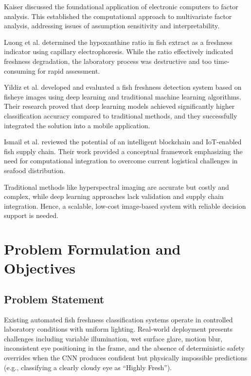 \documentclass[conference]{IEEEtran}
\begin{document}
Kaiser \cite{ref17} discussed the foundational application of electronic computers to factor analysis. This established the computational approach to multivariate factor analysis, addressing issues of assumption sensitivity and interpretability.

Luong et al. \cite{ref18} determined the hypoxanthine ratio in fish extract as a freshness indicator using capillary electrophoresis. While the ratio effectively indicated freshness degradation, the laboratory process was destructive and too time-consuming for rapid assessment.

Yildiz et al. \cite{ref19} developed and evaluated a fish freshness detection system based on fisheye images using deep learning and traditional machine learning algorithms. Their research proved that deep learning models achieved significantly higher classification accuracy compared to traditional methods, and they successfully integrated the solution into a mobile application.

Ismail et al. \cite{ref20} reviewed the potential of an intelligent blockchain and IoT-enabled fish supply chain. Their work provided a conceptual framework emphasizing the need for computational integration to overcome current logistical challenges in seafood distribution.

Traditional methods like hyperspectral imaging are accurate but costly and complex, while deep learning approaches lack validation and supply chain integration. Hence, a scalable, low-cost image-based system with reliable decision support is needed.

\section{Problem Formulation and Objectives}

\subsection{Problem Statement}

Existing automated fish freshness classification systems operate in controlled laboratory conditions with uniform lighting. Real-world deployment presents challenges including variable illumination, wet surface glare, motion blur, inconsistent eye positioning in the frame, and the absence of deterministic safety overrides when the CNN produces confident but physically impossible predictions (e.g., classifying a clearly cloudy eye as ``Highly Fresh'').
\end{document}
